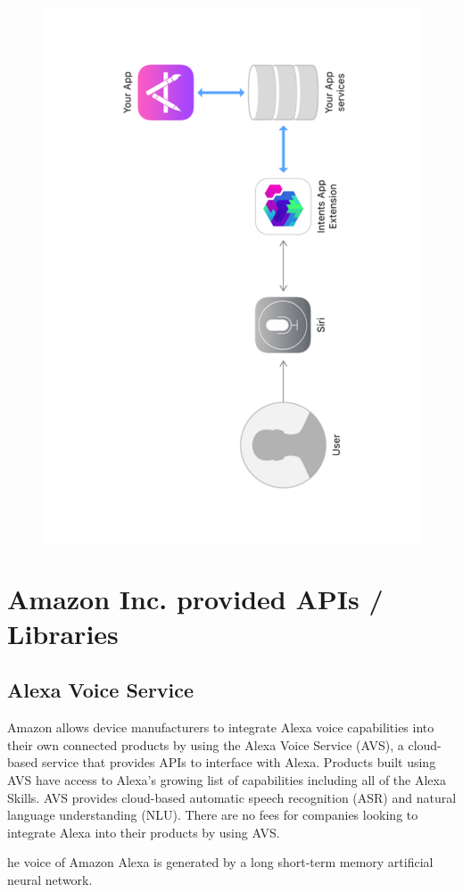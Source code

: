 \documentclass[14pt,a4paper]{article}
\begin{document}
\begin{figure}[h]
\centering
\includegraphics[scale=.5,angle=270]{siriKit.pdf}
\end{figure}
\newpage
\section{Amazon Inc. provided APIs / Libraries}
\subsection{Alexa Voice Service}
\par Amazon allows device manufacturers to integrate Alexa voice capabilities into their own connected products by using the Alexa Voice Service (AVS), a cloud-based service that provides APIs to interface with Alexa. Products built using AVS have access to Alexa's growing list of capabilities including all of the Alexa Skills. AVS provides cloud-based automatic speech recognition (ASR) and natural language understanding (NLU). There are no fees for companies looking to integrate Alexa into their products by using AVS.
\par he voice of Amazon Alexa is generated by a long short-term memory artificial neural network.
\end{document}
